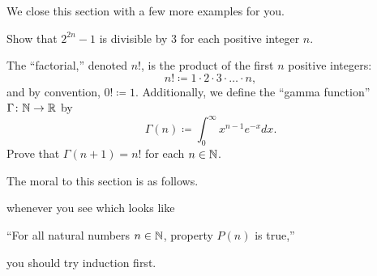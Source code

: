 \documentclass[../main.tex]{subfiles}
\begin{document}
We close this section with a few more examples for you.
\begin{exercise}
    Show that $2^{2n} - 1$ is divisible by 3 for each positive integer $n$.
\end{exercise}
\begin{exercise}
    The ``factorial,'' denoted $n!$, is the product of the first $n$ positive integers:
    \[n!\coloneqq1\cdot2\cdot3\cdot\ldots\cdot n,\]
    and by convention, $0!\coloneqq1$. Additionally, we define the ``gamma function'' $\Gamma\colon \mathbb N \to \mathbb R$ by
    \begin{equation*}
        \Gamma(n) \coloneqq \int_0^\infty x^{n - 1}e^{-x} dx.
    \end{equation*}
    Prove that $\Gamma(n + 1) = n!$ for each $n \in \mathbb N$.
\end{exercise}
The moral to this section is as follows.
\begin{idea}
    whenever you see which looks like
    \begin{center}
        ``For all natural numbers $n \in \mathbb N$, property $P(n)$ is true,''
    \end{center}
    you should try induction first.
\end{idea}
\end{document}
